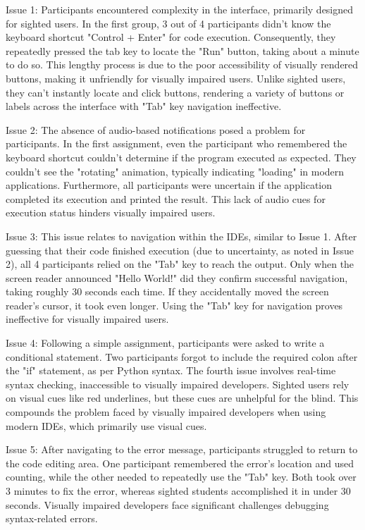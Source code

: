 Issue 1: Participants encountered complexity in the interface, primarily designed for sighted users. In the first group, 3 out of 4 participants didn't know the keyboard shortcut "Control + Enter" for code execution. Consequently, they repeatedly pressed the tab key to locate the "Run" button, taking about a minute to do so. This lengthy process is due to the poor accessibility of visually rendered buttons, making it unfriendly for visually impaired users. Unlike sighted users, they can't instantly locate and click buttons, rendering a variety of buttons or labels across the interface with "Tab" key navigation ineffective.

Issue 2: The absence of audio-based notifications posed a problem for participants. In the first assignment, even the participant who remembered the keyboard shortcut couldn't determine if the program executed as expected. They couldn't see the "rotating" animation, typically indicating "loading" in modern applications. Furthermore, all participants were uncertain if the application completed its execution and printed the result. This lack of audio cues for execution status hinders visually impaired users.

Issue 3: This issue relates to navigation within the IDEs, similar to Issue 1. After guessing that their code finished execution (due to uncertainty, as noted in Issue 2), all 4 participants relied on the "Tab" key to reach the output. Only when the screen reader announced "Hello World!" did they confirm successful navigation, taking roughly 30 seconds each time. If they accidentally moved the screen reader's cursor, it took even longer. Using the "Tab" key for navigation proves ineffective for visually impaired users.

Issue 4: Following a simple assignment, participants were asked to write a conditional statement. Two participants forgot to include the required colon after the "if" statement, as per Python syntax. The fourth issue involves real-time syntax checking, inaccessible to visually impaired developers. Sighted users rely on visual cues like red underlines, but these cues are unhelpful for the blind. This compounds the problem faced by visually impaired developers when using modern IDEs, which primarily use visual cues.

Issue 5: After navigating to the error message, participants struggled to return to the code editing area. One participant remembered the error's location and used counting, while the other needed to repeatedly use the "Tab" key. Both took over 3 minutes to fix the error, whereas sighted students accomplished it in under 30 seconds. Visually impaired developers face significant challenges debugging syntax-related errors.

